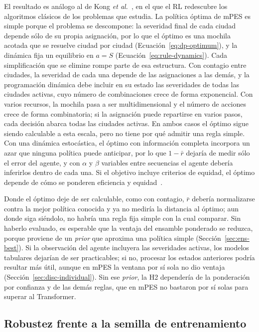 \documentclass[../00_Main/Main.tex]{subfiles}
\begin{document}
El resultado es an\'alogo al de Kong \emph{et al.}~\citep{Kong2019}, en el
que el RL redescubre los algoritmos cl\'asicos de los problemas que
estudia. La pol\'itica \'optima de mPES es simple porque el problema se
descompone: la severidad final de cada ciudad depende s\'olo de su propia
asignaci\'on, por lo que el \'optimo es una mochila acotada que se resuelve
ciudad por ciudad (Ecuaci\'on~\eqref{eq:dp-optimum}), y la din\'amica fija
un equilibrio en $a = S$ (Ecuaci\'on~\eqref{eq:rule-dynamics}). Cada
simplificaci\'on que se elimine rompe parte de esa estructura. Con
contagio entre ciudades, la severidad de cada una depende de las
asignaciones a las dem\'as, y la programaci\'on din\'amica debe incluir
en su estado las severidades de todas las ciudades activas, cuyo n\'umero
de combinaciones crece de forma exponencial. Con varios recursos, la
mochila pasa a ser multidimensional y el n\'umero de acciones crece de
forma combinatoria; si la asignaci\'on puede repartirse en varios pasos,
cada decisi\'on abarca todas las ciudades activas. En ambos casos el
\'optimo sigue siendo calculable a esta escala, pero no tiene por qu\'e
admitir una regla simple. Con una din\'amica estoc\'astica, el
\'optimo con informaci\'on completa incorpora un azar que ninguna
pol\'itica puede anticipar, por lo que $1 - \bar r$ dejar\'ia de medir
s\'olo el error del agente, y con $\alpha$ y $\beta$ variables entre
secuencias el agente deber\'ia inferirlos dentro de cada una. Si el
objetivo incluye criterios de equidad, el \'optimo depende de c\'omo se
ponderen eficiencia y equidad~\citep{Sinclair2023}.

Donde el \'optimo deje de ser calculable, como con contagio, $\bar r$
deber\'ia normalizarse contra la mejor pol\'itica conocida
y ya no medir\'ia la distancia al \'optimo; aun donde siga si\'endolo, no
habr\'ia una regla fija simple con la cual comparar. Sin haberlo evaluado,
es esperable que la ventaja del ensamble ponderado se reduzca, porque
proviene de un \emph{prior} que aproxima una pol\'itica simple
(Secci\'on~\ref{sec:ens-best}). Si la observaci\'on del agente incluyera
las severidades activas, los modelos tabulares dejar\'ian de ser
practicables; si no, procesar los estados anteriores podr\'ia resultar
m\'as \'util, aunque en mPES la ventana por s\'i sola no dio ventaja
(Secci\'on~\ref{sec:disc-individual}). Sin ese \emph{prior}, la H2
depender\'ia de la ponderaci\'on por confianza y de
las dem\'as reglas, que en mPES no bastaron por s\'i solas para superar al
Transformer.

\subsection{Robustez frente a la semilla de entrenamiento}\label{sec:disc-seeds}
\end{document}
